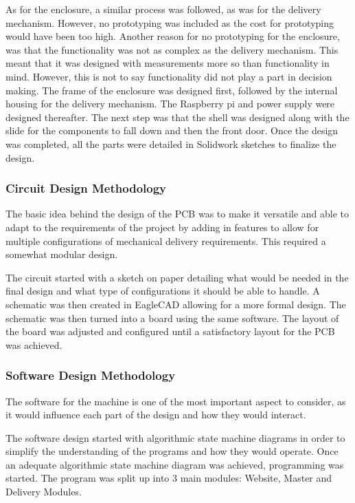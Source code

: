 \documentclass[a4paper,11pt]{article}
\numberwithin{figure}{section}
\numberwithin{table}{section}
\begin{document}
As for the enclosure, a similar process was followed, as was for the delivery mechanism. However, no prototyping was included as the cost for prototyping would have been too high. Another reason for no prototyping for the enclosure, was that the functionality was not as complex as the delivery mechanism. This meant that it was designed with measurements more so than functionality in mind. However, this is not to say functionality did not play a part in decision making. The frame of the enclosure was designed first, followed by the internal housing for the delivery mechanism. The Raspberry pi and power supply were designed thereafter. The next step was that the shell was designed along with the slide for the components to fall down and then the front door. Once the design was completed, all the parts were detailed in Solidwork sketches to finalize the design.

\subsubsection{Circuit Design Methodology}
The basic idea behind the design of the PCB was to make it versatile and able to adapt to the requirements of the project by adding in features to allow for multiple configurations of mechanical delivery requirements. This required a somewhat modular design.

The circuit started with a sketch on paper detailing what would be needed in the final design and what type of configurations it should be able to handle. A schematic was then created in EagleCAD allowing for a more formal design. The schematic was then turned into a board using the same software. The layout of the board was adjusted and configured until a satisfactory layout for the PCB was achieved.

\subsubsection{Software Design Methodology}
The software for the machine is one of the most important aspect to consider, as it would influence each part of the design and how they would interact.

The software design started with algorithmic state machine diagrams in order to simplify the understanding of the programs and how they would operate. Once an adequate algorithmic state machine diagram was achieved, programming was started. The program was split up into 3 main modules: Website, Master and Delivery Modules. 
\end{document}
